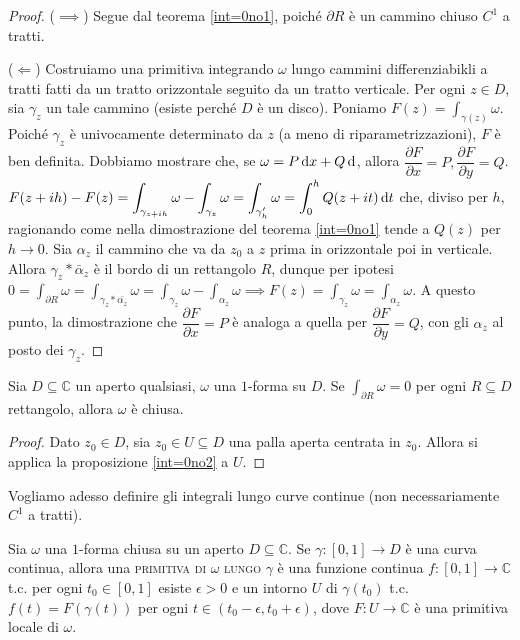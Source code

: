 \begin{proof}
  ($\implies$) Segue dal teorema \ref{int=0no1}, poiché $\partial R$ è un cammino chiuso $C^1$ a tratti.

  ($\Leftarrow$) Costruiamo una primitiva integrando $\omega$ lungo cammini differenziabikli a tratti fatti da un tratto orizzontale seguito da un tratto verticale. Per ogni $z \in D$, sia $\gamma_z$ un tale cammino (esiste perché $D$ è un disco). Poniamo $\displaystyle F(z)=\int_{\gamma(z)} \omega$. Poiché $\gamma_z$ è univocamente determinato da $z$ (a meno di riparametrizzazioni), $F$ è ben definita. Dobbiamo mostrare che, se $\omega=P\mathop{}\!\mathrm{d} x+Q\mathop{}\!\mathrm{d} $, allora $\dfrac{\partial F}{\partial x}=P, \dfrac{\partial F}{\partial y}=Q$.
  $\displaystyle F(z+ih)-F(z)=\int_{\gamma_{z+ih}} \omega-\int_{\gamma_z} \omega=\int_{\gamma_h'} \omega=\int_0^h Q(z+it) \mathop{}\!\mathrm{d} t$ che, diviso per $h$, ragionando come nella dimostrazione del teorema \ref{int=0no1} tende a $Q(z)$ per $h \longrightarrow 0$. Sia $\alpha_z$ il cammino che va da $z_0$ a $z$ prima in orizzontale poi in verticale.
  Allora $\gamma_z * \bar{\alpha}_z$ è il bordo di un rettangolo $R$, dunque per ipotesi $\displaystyle 0=\int_{\partial R} \omega=\int_{\gamma_z*\bar{\alpha_z}} \omega=\int_{\gamma_z}\omega-\int_{\alpha_z} \omega \implies F(z)=\int_{\gamma_z}\omega=\int_{\alpha_z}\omega$.
  A questo punto, la dimostrazione che $\dfrac{\partial F}{\partial x}=P$ è analoga a quella per $\dfrac{\partial F}{\partial y}=Q$, con gli $\alpha_z$ al posto dei $\gamma_z$.
\end{proof}

\begin{cor}
  Sia $D \subseteq \mathbb{C}$ un aperto qualsiasi, $\omega$ una $1$-forma su $D$. Se $\displaystyle \int_{\partial R} \omega=0$ per ogni $R \subseteq D$ rettangolo, allora $\omega$ è chiusa.
\end{cor}

\begin{proof}
  Dato $z_0 \in D$, sia $z_0 \in U \subseteq D$ una palla aperta centrata in $z_0$. Allora si applica la proposizione \ref{int=0no2} a $U$.
\end{proof}

Vogliamo adesso definire gli integrali lungo curve continue (non necessariamente $C^1$ a tratti).

\begin{defn} \label{prim_gamma}
  Sia $\omega$ una $1$-forma chiusa su un aperto $D \subseteq \mathbb{C}$. Se $\gamma:[0, 1] \longrightarrow D$ è una curva continua, allora una \textsc{primitiva di $\omega$ lungo $\gamma$} è una funzione continua $f:[0, 1] \longrightarrow \mathbb{C}$ t.c. per ogni $t_0 \in [0, 1]$ esiste $\epsilon>0$ e un intorno $U$ di $\gamma(t_0)$ t.c.
  $f(t)=F(\gamma(t))$ per ogni $t \in (t_0-\epsilon, t_0+\epsilon)$, dove $F:U \longrightarrow \mathbb{C}$ è una primitiva locale di $\omega$.
\end{defn}

